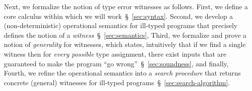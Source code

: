 %
%
%


Next, we formalize the notion of type error witnesses as follows.
%
First, we define a core calculus within which we will work~\S~\ref{sec:syntax}.
%
Second, we develop a (non-deterministic) operational semantics
for ill-typed programs that precisely defines the notion
of a \emph{witness}~\S~\ref{sec:semantics},
%
Third, we formalize and prove a notion of \emph{generality} for
witnesses, which states, intuitively that if we find a
single witness then for \emph{every possible} type
assignment, there exist inputs that are guaranteed to make
the program ``go wrong''~\S~\ref{sec:soundness}, and finally,
%
Fourth, we refine the operational semantics into a
\emph{search procedure} that returns concrete (general)
witnesses for ill-typed programs~\S~\ref{sec:search-algorithm}.

